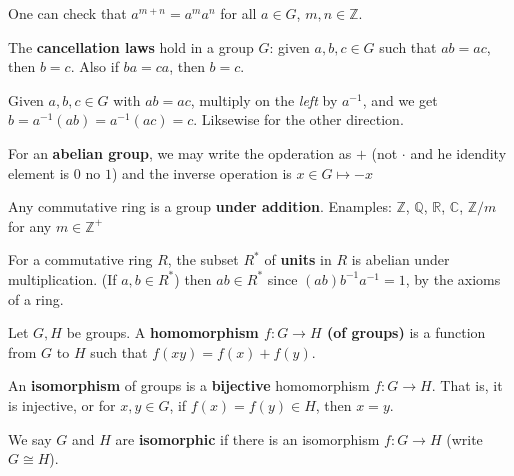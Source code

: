 \documentclass{notes}
\begin{document}
One can check that $a^{m + n} = a^m a^n$ for all $a \in G$, $m, n \in \mathbb Z$.

\begin{lem}
  The {\boldmath \bfseries cancellation laws} hold in a group $G$: given $a, b, c \in G$ such that $a b = a c$, then $b = c$.
  Also if $b a = c a$, then $b = c$.
\end{lem}

\begin{prf}
  Given $a, b, c \in G$ with $a b = a c$, multiply on the \textit{left} by $a^{-1}$, and we get $b = a^{-1} (a b) = a^{-1} (a c) = c$.
  Liksewise for the other direction.
\end{prf}

\begin{rmk}
  For an {\boldmath \bfseries abelian group}, we may write the opderation as $+$ (not $\cdot$ and he idendity element is $0$ no $1$) and the inverse operation is $x \in G \mapsto -x$
\end{rmk}

\begin{eg}
  Any commutative ring is a group {\boldmath \bfseries under addition}.
  Enamples: $\mathbb Z$, $\mathbb Q$, $\mathbb R$, $\mathbb C$, $\mathbb Z / m$ for any $m \in \mathbb Z^+$
\end{eg}

\begin{eg}
  For a commutative ring $R$, the subset $R^*$ of {\boldmath \bfseries units} in $R$ is abelian under multiplication.
  (If $a, b \in R^*$) then $a b \in R^*$ since $(a b) b^{-1} a^{-1} = 1$, by the axioms of a ring.
\end{eg}

\begin{defn}
  Let $G, H$ be groups.
  A {\boldmath \bfseries homomorphism $f \colon G \to H$ (of groups)} is a function from $G$ to $H$ such that $f(xy) = f (x) + f(y)$.
\end{defn}

\phantom{fix}

\begin{defn}
  An {\boldmath \bfseries isomorphism} of groups is a {\boldmath \bfseries bijective} homomorphism $f \colon G \to H$.
  That is, it is injective, or for $x, y \in G$, if $f(x) = f(y) \in H$, then $x = y$.

  We say $G$ and $H$ are {\boldmath \bfseries isomorphic} if there is an isomorphism $f \colon G \to H$ (write $G \cong H$).
\end{defn}
\end{document}
